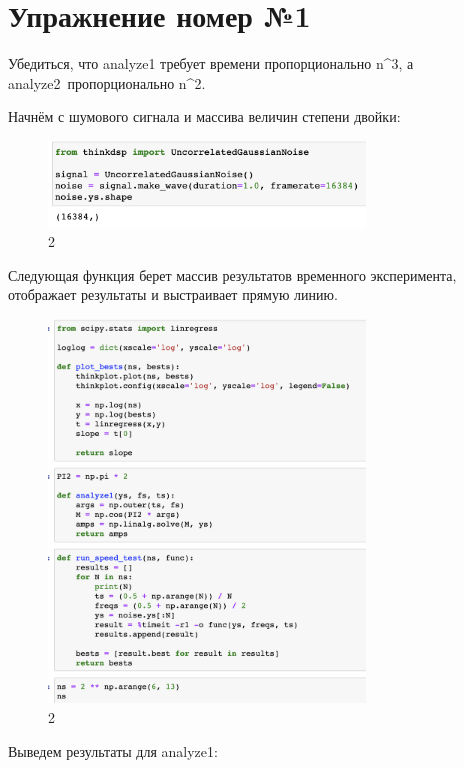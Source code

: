 \documentclass[10pt,a4paper,oneside]{article}
\begin{document}
\section{Упражнение номер №1}

Убедиться, что analyze1 требует времени пропорционально n^3, а analyze2 пропорционально n^2.

Начнём с шумового сигнала и массива величин степени двойки:

\begin{figure}[H]
        \centering
        \includegraphics[width=0.75\textwidth]{pics/1.png}
        \caption{2}
        \label{fig:first}
\end{figure}

Следующая функция берет массив результатов временного эксперимента, отображает результаты и выстраивает прямую линию.

\begin{figure}[H]
        \centering
        \includegraphics[width=0.75\textwidth]{pics/2.png}
        \caption{2}
        \label{fig:first}
\end{figure}

Выведем результаты для analyze1:
\end{document}
